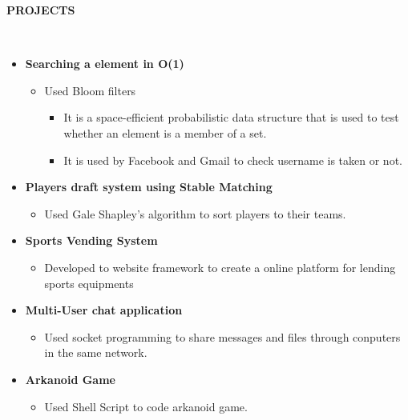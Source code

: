 \documentclass[a4paper,10pt]{article}
\newcommand{\isep}{-2 pt}
\newcommand{\lsep}{-0.5cm}
\newcommand{\resheading}[1]{{\small \colorbox{mygrey}{\begin{minipage}{0.975\textwidth}{\textbf{#1 \vphantom{p\^{E}}}}\end{minipage}}}}
\begin{document}
\resheading{\textbf{PROJECTS} }\\[\lsep]
\begin{itemize}

\item \textbf{Searching a element in O(1)
}  \\[-0.6cm]
	\begin{itemize}\itemsep \isep
	\item Used Bloom filters
	    \begin{itemize}\itemsep \isep
	    \item It is a space-efficient probabilistic data structure that is used to test whether an element is a member of a set.
	    \item It is used by Facebook and Gmail to check username is taken or not.
	    \end{itemize}
	\end{itemize}
	

\item \textbf{Players draft system using Stable Matching
}  \\[-0.6cm]
	\begin{itemize}\itemsep \isep
	\item Used Gale Shapley's algorithm to sort players to their teams.
	
	\end{itemize}
	\item \textbf{Sports Vending System
}  \\[-0.6cm]
	\begin{itemize}\itemsep \isep
	\item Developed to website framework to create a online platform for lending sports equipments
	
	\end{itemize}

\item \textbf{Multi-User chat application 
}  \\[-0.6cm]
	\begin{itemize}\itemsep \isep
	\item Used socket programming to share messages and files through conputers in the same network.
	
	\end{itemize}
	
	

	
	\item \textbf{Arkanoid Game
}  \\[-0.6cm]
	\begin{itemize}\itemsep \isep
	\item Used Shell Script to code arkanoid game.
	
	\end{itemize}
	
	
	
	
	

	
\end{itemize}
\end{document}
